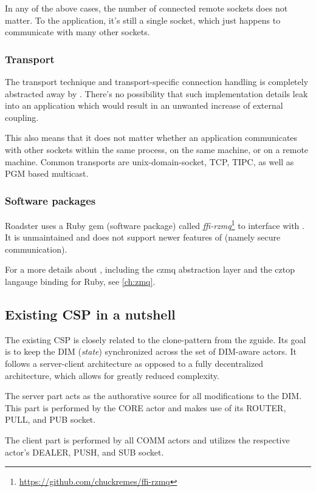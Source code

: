 In any of the above cases, the number of connected remote sockets does not
matter. To the application, it's still a single socket, which just happens to
communicate with many other sockets.

\subsubsection{Transport}
The transport technique and transport-specific connection handling is completely
abstracted away by \zmq. There's no possibility that such implementation
details leak into an application which would result in an unwanted increase of
external coupling.

This also means that it does not matter whether an application communicates with
other \zmq sockets within the same process, on the same machine, or on a remote
machine. Common transports are \gls{unix-domain-socket}, \gls{TCP},
\gls{TIPC}, as well as \gls{PGM} based multicast.

\subsubsection{Software packages}
Roadster uses a Ruby gem (software package) called
\emph{ffi-rzmq}\footnote{\url{https://github.com/chuckremes/ffi-rzmq}} to
interface with \zmq. It is unmaintained and does not support newer features of
\zmq (namely secure communication).


For a more details about \zmq, including the \gls{czmq} abstraction layer and
the \gls{cztop} langauge binding for Ruby, see \autoref{ch:zmq}.


\subsection{Existing CSP in a nutshell}\label{sec:scope:csp}
The existing \acrfull{CSP} is closely related to the \gls{clone-pattern} from
the \gls{zguide}. Its goal is to keep the \gls{DIM} (\emph{state}) synchronized
across the set of DIM-aware actors.  It follows a server-client architecture as
opposed to a fully decentralized architecture, which allows for greatly reduced
complexity.

The server part acts as the authorative source for all modifications to the
DIM. This part is performed by the CORE actor and makes use of its ROUTER, PULL, and
PUB socket.

The client part is performed by all COMM actors and utilizes the respective
actor's DEALER, PUSH, and SUB socket.

